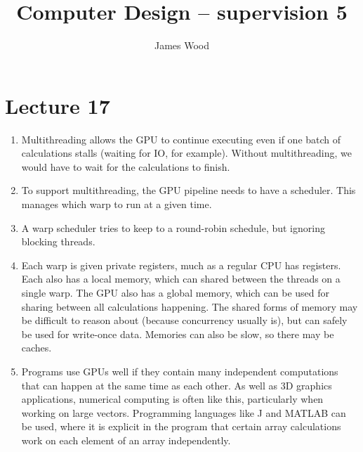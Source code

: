\documentclass{article}
\begin{document}
\title{Computer Design -- supervision 5}
\author{James Wood}
\maketitle

\section{Lecture 17}
\begin{enumerate}
  \item Multithreading allows the GPU to continue executing even if one batch of calculations stalls (waiting for IO, for example). Without multithreading, we would have to wait for the calculations to finish.
  \item To support multithreading, the GPU pipeline needs to have a scheduler. This manages which warp to run at a given time.
  \item A warp scheduler tries to keep to a round-robin schedule, but ignoring blocking threads.
  \item Each warp is given private registers, much as a regular CPU has registers. Each also has a local memory, which can shared between the threads on a single warp. The GPU also has a global memory, which can be used for sharing between all calculations happening. The shared forms of memory may be difficult to reason about (because concurrency usually is), but can safely be used for write-once data. Memories can also be slow, so there may be caches.
  \item Programs use GPUs well if they contain many independent computations that can happen at the same time as each other. As well as 3D graphics applications, numerical computing is often like this, particularly when working on large vectors. Programming languages like J and MATLAB can be used, where it is explicit in the program that certain array calculations work on each element of an array independently.
\end{enumerate}
\end{document}
